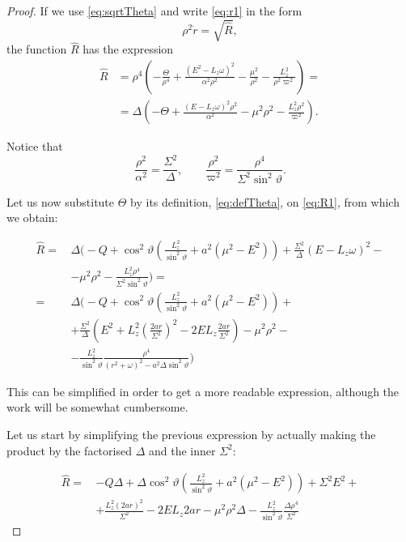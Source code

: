 \begin{proof}
	If we use \autoref{eq:sqrtTheta} and write \autoref{eq:r1} in the form
	\[
	\rho^2 \dot{r} = \sqrt{\widehat{R}},
	\]
	the function $\widehat{R}$ has the expression
	\begin{align}
	\nonumber
	\widehat{R} &= \rho^4 \left( -\frac{\Theta}{\rho^4} + \frac{(E^2 - L_z\omega)^2}{\alpha^2\rho^2} - \frac{\mu^2}{\rho^2} - \frac{L_z^2}{\rho^2\varpi^2} \right) = \\
	&= \Delta \left( -\Theta + \frac{(E-L_z\omega)^2\rho^2}{\alpha^2} - \mu^2\rho^2 - \frac{L_z^2 \rho^2}{\varpi^2} \right).
	\label{eq:R1}
	\end{align}
	
	Notice that
	\[
	\frac{\rho^2}{\alpha^2} = \frac{\Sigma^2}{\Delta}, \qquad \frac{\rho^2}{\varpi^2} = \frac{\rho^4}{\Sigma^2 \sin^2\vartheta}.
	\]
	
	Let us now substitute $\Theta$ by its definition, \autoref{eq:defTheta}, on \autoref{eq:R1}, from which we obtain:
	
	\begin{align}
	\widehat{R} =\,& \Delta \biggl( -Q + \cos^2\vartheta\left( \frac{L_z^2}{\sin^2\vartheta} + a^2 (\mu^2 - E^2) \right) + \frac{\Sigma^2}{\Delta}(E - L_z\omega)^2 - \nonumber \\
	&- \mu^2\rho^2 - \frac{L_z^2\rho^4}{\Sigma^2\sin^2\vartheta} \biggr) = \nonumber \\
	=\,& \Delta \biggl( -Q + \cos^2\vartheta\left( \frac{L_z^2}{\sin^2\vartheta} + a^2 (\mu^2 - E^2) \right) + \nonumber \\
	&+ \frac{\Sigma^2}{\Delta}\left( E^2 + L_z^2\left( \frac{2ar}{\Sigma^2} \right)^2 - 2EL_z\frac{2ar}{\Sigma^2} \right)  - \mu^2\rho^2 - \nonumber \\
	&- \frac{L_z^2}{\sin^2\vartheta}\frac{\rho^4}{(r^2 + \omega)^2 - a^2\Delta\sin^2\vartheta} \biggr)
	\end{align}
	
	This can be simplified in order to get a more readable expression, although the work will be somewhat cumbersome.
	
	Let us start by simplifying the previous expression by actually making the product by the factorised $\Delta$ and the inner $\Sigma^2$:
	
	\begin{align}
	\widehat{R} =\,& -Q\Delta + \Delta\cos^2\vartheta\left( \frac{L_z^2}{\sin^2\vartheta} + a^2 (\mu^2 - E^2) \right) + \Sigma^2 E^2 + \nonumber \\
	&+ \frac{L_z^2 (2ar)^2}{\Sigma^2} - 2 E L_z 2ar  - \mu^2\rho^2\Delta - \frac{L_z^2}{\sin^2\vartheta}\frac{\Delta\rho^4}{\Sigma^2}
	\label{eq:R2}
	\end{align}
	

\end{proof}
